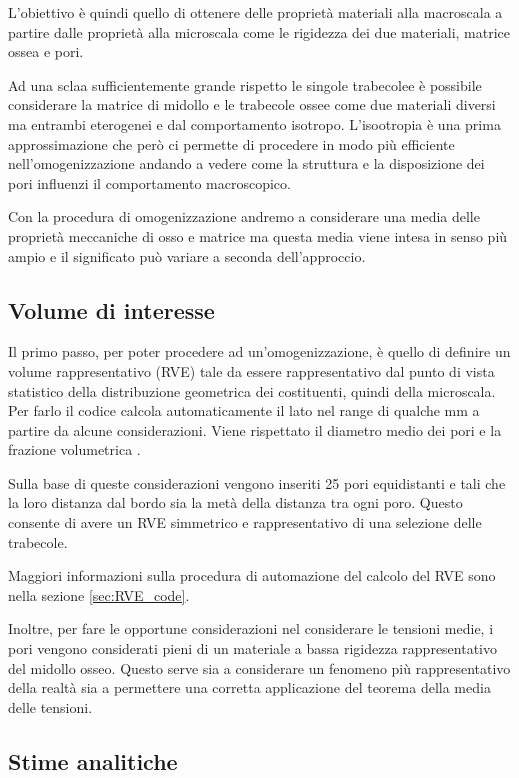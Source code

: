 \documentclass[a4paper,num-refs]{oup-contemporary}
\begin{document}
L'obiettivo è quindi quello di ottenere delle proprietà materiali alla macroscala a partire dalle proprietà alla microscala come le rigidezza dei due materiali, matrice ossea e pori.

Ad una sclaa sufficientemente grande rispetto le singole trabecolee è possibile considerare la matrice di midollo e le trabecole ossee come due materiali diversi ma entrambi eterogenei e dal comportamento isotropo. L'isootropia è una prima approssimazione che però ci permette di procedere in modo più efficiente nell'omogenizzazione andando a vedere come la struttura e la disposizione dei pori influenzi il comportamento macroscopico. 

Con la procedura di omogenizzazione andremo a considerare una media delle proprietà meccaniche di osso e matrice ma questa media viene intesa in senso più ampio e il significato può variare a seconda dell'approccio. 

\subsection{Volume di interesse}
\label{sec:RVE}

Il primo passo, per poter procedere ad un'omogenizzazione, è quello di definire un volume rappresentativo (RVE) tale da essere rappresentativo dal punto di vista statistico della distribuzione geometrica dei costituenti, quindi della microscala. Per farlo il codice calcola automaticamente il lato nel range di qualche mm a partire da alcune considerazioni. Viene rispettato il diametro medio dei pori \citep{Doktor:2011} e la frazione volumetrica  \citep{Cowin1}. 

Sulla base di queste considerazioni vengono inseriti 25 pori equidistanti e tali che la loro distanza dal bordo sia la metà della distanza tra ogni poro. Questo consente di avere un RVE simmetrico e rappresentativo di una selezione delle trabecole. 

Maggiori informazioni sulla procedura di automazione del calcolo del RVE sono nella sezione \ref{sec:RVE_code}.

Inoltre, per fare le opportune considerazioni nel considerare le tensioni medie, i pori vengono considerati pieni di un materiale a bassa rigidezza rappresentativo del midollo osseo. Questo serve sia a considerare un fenomeno più rappresentativo della realtà sia a permettere una corretta applicazione del teorema della media delle tensioni. 




\subsection{Stime analitiche}
\end{document}
